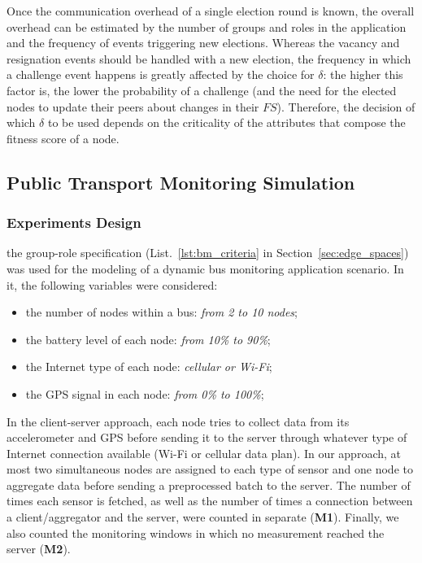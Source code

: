 
Once the communication overhead of a single election round is known, the overall overhead can be estimated by the number of groups and roles in the application and the frequency of events triggering new elections. Whereas the vacancy and resignation events should be handled with a new election, the frequency in which a challenge event happens is greatly affected by the choice for $\delta$: the higher this factor is, the lower the probability of a challenge (and the need for the elected nodes to update their peers about changes in their $FS$). Therefore, the decision of which $\delta$ to be used depends on the criticality of the attributes that compose the fitness score of a node. 



\subsection{Public Transport Monitoring Simulation}

\subsubsection{Experiments Design}

the group-role specification (List.~\ref{lst:bm_criteria} in Section~\ref{sec:edge_spaces}) was used for the modeling of a dynamic bus monitoring application scenario. In it, the following variables were considered:

\begin{itemize}
	
	\item the number of nodes within a bus: \textit{from 2 to 10 nodes};
	
	\item the battery level of each node: \textit{from 10\% to 90\%};
	
	\item the Internet type of each node: \textit{cellular or Wi-Fi};
	
	\item the GPS signal in each node: \textit{from 0\% to 100\%};
	
\end{itemize}

In the client-server approach, each node tries to collect data from its accelerometer and GPS before sending it to the server through whatever type of Internet connection available (Wi-Fi or cellular data plan). In our approach, at most two simultaneous nodes are assigned to each type of sensor and one node to aggregate data before sending a preprocessed batch to the server. The number of times each sensor is fetched, as well as the number of times a connection between a client/aggregator and the server, were counted in separate (\textbf{M1}). Finally, we also counted the monitoring windows in which no measurement reached the server (\textbf{M2}).

